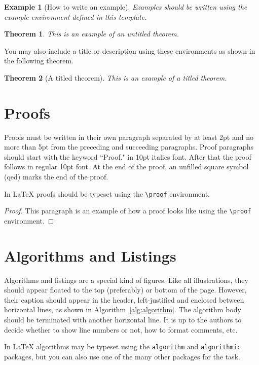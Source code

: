 \documentclass{article}
\newtheorem{example}{Example}
\newtheorem{theorem}{Theorem}
\begin{document}
\begin{example}[How to write an example]
Examples should be written using the example environment defined in this template.
\end{example}

\begin{theorem}
This is an example of an untitled theorem.
\end{theorem}

You may also include a title or description using these environments as shown in the following theorem.

\begin{theorem}[A titled theorem]
This is an example of a titled theorem.
\end{theorem}

\section{Proofs}

Proofs must be written in their own paragraph separated by at least 2pt and no
more than 5pt from the preceding and succeeding paragraphs. Proof paragraphs
should start with the keyword ``Proof." in 10pt italics font. After that the
proof follows in regular 10pt font. At the end of the proof, an unfilled square
symbol (qed) marks the end of the proof.

In \LaTeX{} proofs should be typeset using the \texttt{\textbackslash{}proof}
environment.

\begin{proof}
This paragraph is an example of how a proof looks like using the
\texttt{\textbackslash{}proof} environment.
\end{proof}


\section{Algorithms and Listings}

Algorithms and listings are a special kind of figures. Like all illustrations,
they should appear floated to the top (preferably) or bottom of the
page. However, their caption should appear in the header, left-justified and
enclosed between horizontal lines, as shown in
Algorithm~\ref{alg:algorithm}. The algorithm body should be terminated with
another horizontal line. It is up to the authors to decide whether to show line
numbers or not, how to format comments, etc.

In \LaTeX{} algorithms may be typeset using the \texttt{algorithm} and
\texttt{algorithmic} packages, but you can also use one of the many other
packages for the task.
\end{document}
